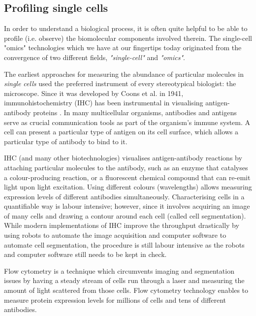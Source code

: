 \subsection{Profiling single cells}
In order to understand a biological process, it is often quite helpful to be able to profile (i.e. observe) the biomolecular components involved therein. The single-cell "omics" technologies which we have at our fingertips today originated from the convergence of two different fields, \emph{"single-cell"} and \emph{"omics"}.

The earliest approaches for measuring the abundance of particular molecules in \emph{single cells} used the preferred instrument of every stereotypical biologist: the microscope.
Since it was developed by Coons et al. in 1941, immunohistochemistry (IHC) has been instrumental in visualising antigen-antibody proteins \cite{coons_immunologicalpropertiesantibody_1941}. In many multicellular organisms, antibodies and antigens serve as crucial communication tools as part of the organism's immune system. A cell can present a particular type of antigen on its cell surface, which allows a particular type of antibody to bind to it.


IHC (and many other biotechnologies) visualises antigen-antibody reactions by attaching particular molecules to the antibody, such as an enzyme that catalyses a colour-producing reaction, or a fluorescent chemical compound that can re-emit light upon light excitation. Using different colours (wavelengths) allows measuring expression levels of different antibodies simultaneously. Characterising cells in a quantifiable way is labour intensive; however, since it involves acquiring an image of many cells and drawing a contour around each cell (called cell segmentation). While modern implementations of IHC improve the throughput drastically by using robots to automate the image acquisition and computer software to automate cell segmentation, the procedure is still labour intensive as the robots and computer software still needs to be kept in check.

Flow cytometry \cite{fulwyler_electronicseparationbiological_1965} is a technique which circumvents imaging and segmentation issues by having a steady stream of cells run through a laser and measuring the amount of light scattered from those cells. Flow cytometry technology enables to measure protein expression levels for millions of cells and tens of different antibodies. 

